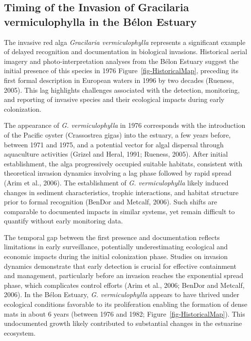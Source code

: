 \documentclass[
  letterpaper,
  DIV=11,
  numbers=noendperiod]{scrartcl}
\begin{document}
\subsection{Timing of the Invasion of Gracilaria vermiculophylla in the
Bélon
Estuary}\label{timing-of-the-invasion-of-gracilaria-vermiculophylla-in-the-buxe9lon-estuary}

The invasive red alga \emph{Gracilaria vermiculophylla} represents a
significant example of delayed recognition and documentation in
biological invasions. Historical aerial imagery and photo-interpretation
analyses from the Bélon Estuary suggest the initial presence of this
species in 1976 Figure~\ref{fig-HistoricalMap}, preceding its first
formal description in European waters in 1996 by two decades (Rueness,
2005). This lag highlights challenges associated with the detection,
monitoring, and reporting of invasive species and their ecological
impacts during early colonization.

The appearance of \emph{G. vermiculophylla} in 1976 corresponds with the
introduction of the Pacific oyster (Crassostrea gigas) into the estuary,
a few years before, between 1971 and 1975, and a potential vector for
algal dispersal through aquaculture activities (Grizel and Heral, 1991;
Rueness, 2005). After initial establishment, the alga progressively
occupied suitable habitats, consistent with theoretical invasion
dynamics involving a lag phase followed by rapid spread (Arim et al.,
2006). The establishment of \emph{G. vermiculophylla} likely induced
changes in sediment characteristics, trophic interactions, and habitat
structure prior to formal recognition (BenDor and Metcalf, 2006). Such
shifts are comparable to documented impacts in similar systems, yet
remain difficult to quantify without early monitoring data.

The temporal gap between the first presence and documentation reflects
limitations in early surveillance, potentially underestimating
ecological and economic impacts during the initial colonization phase.
Studies on invasion dynamics demonstrate that early detection is crucial
for effective containment and management, particularly before an
invasion reaches the exponential spread phase, which complicates control
efforts (Arim et al., 2006; BenDor and Metcalf, 2006). In the Bélon
Estuary, \emph{G. vermiculophylla} appears to have thrived under
ecological conditions favorable to its proliferation enabling the
formation of dense mats in about 6 years (between 1976 and 1982;
Figure~\ref{fig-HistoricalMap}). This undocumented growth likely
contributed to substantial changes in the estuarine ecosystem.
\end{document}
